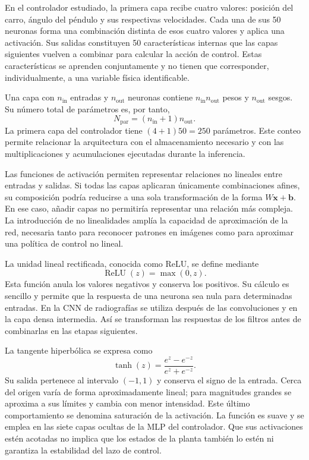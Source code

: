 En el controlador estudiado, la primera capa recibe cuatro valores: posición del carro, ángulo del péndulo y sus respectivas velocidades. Cada una de sus 50 neuronas forma una combinación distinta de esos cuatro valores y aplica una activación. Sus salidas constituyen 50 características internas que las capas siguientes vuelven a combinar para calcular la acción de control. Estas características se aprenden conjuntamente y no tienen que corresponder, individualmente, a una variable física identificable.

Una capa con $n_{\mathrm{in}}$ entradas y $n_{\mathrm{out}}$ neuronas contiene $n_{\mathrm{in}}n_{\mathrm{out}}$ pesos y $n_{\mathrm{out}}$ sesgos. Su número total de parámetros es, por tanto,
\begin{equation}
N_{\mathrm{par}}=(n_{\mathrm{in}}+1)n_{\mathrm{out}}.
\end{equation}
La primera capa del controlador tiene $(4+1)50=250$ parámetros. Este conteo permite relacionar la arquitectura con el almacenamiento necesario y con las multiplicaciones y acumulaciones ejecutadas durante la inferencia.

Las funciones de activación permiten representar relaciones no lineales entre entradas y salidas. Si todas las capas aplicaran únicamente combinaciones afines, su composición podría reducirse a una sola transformación de la forma $W\mathbf x+\mathbf b$. En ese caso, añadir capas no permitiría representar una relación más compleja. La introducción de no linealidades amplía la capacidad de aproximación de la red, necesaria tanto para reconocer patrones en imágenes como para aproximar una política de control no lineal.

La unidad lineal rectificada, conocida como ReLU, se define mediante
\begin{equation}
\operatorname{ReLU}(z)=\max(0,z).
\end{equation}
Esta función anula los valores negativos y conserva los positivos. Su cálculo es sencillo y permite que la respuesta de una neurona sea nula para determinadas entradas. En la CNN de radiografías se utiliza después de las convoluciones y en la capa densa intermedia. Así se transforman las respuestas de los filtros antes de combinarlas en las etapas siguientes.

La tangente hiperbólica se expresa como
\begin{equation}
\tanh(z)=\frac{e^z-e^{-z}}{e^z+e^{-z}}.
\end{equation}
Su salida pertenece al intervalo $(-1,1)$ y conserva el signo de la entrada. Cerca del origen varía de forma aproximadamente lineal; para magnitudes grandes se aproxima a sus límites y cambia con menor intensidad. Este último comportamiento se denomina saturación de la activación. La función es suave y se emplea en las siete capas ocultas de la MLP del controlador. Que sus activaciones estén acotadas no implica que los estados de la planta también lo estén ni garantiza la estabilidad del lazo de control.

